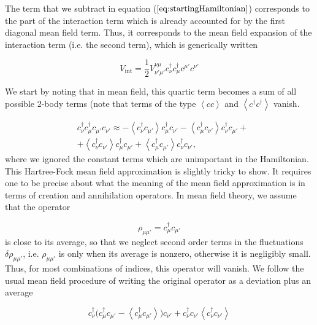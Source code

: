 \documentclass[10pt, twocolumn, twoside]{article}
\begin{document}
The term that we subtract in equation ($\ref{eq:startingHamiltonian}$) corresponds to the part of the interaction term which is already accounted for by the first diagonal mean field term. Thus, it corresponds to the mean field expansion of the interaction term (i.e. the second term), which is generically written

\begin{equation}
V_{\text{int}} = \frac{1}{2} V^{\nu\mu}_{\nu'\mu'} c_\nu^\dagger c_\mu^\dagger c^{\mu'} c^{\nu'}
\end{equation}

We start by noting that in mean field, this quartic term becomes a sum of all possible 2-body terms (note that terms of the type $\left\langle cc \right\rangle$ and $\left\langle c^\dagger c^\dagger \right\rangle$ vanish.

\begin{equation}\label{eq:c_mft}
\begin{split}
&c_\nu^\dagger c_\mu^\dagger c_{\mu'} c_{\nu'} \approx - \left\langle c_\nu^\dagger c_{\mu'} \right\rangle  c_{\mu}^\dagger c_{\nu'} - \left\langle c_{\mu}^\dagger c_{\nu'} \right\rangle c_{\nu}^\dagger c_{\mu'} + \\
&+ \left\langle c_{\nu}^\dagger c_{\nu'} \right\rangle  c_{\mu}^\dagger c_{\mu'} + \left\langle c_{\mu}^\dagger c_{\mu'} \right\rangle  c_{\nu}^\dagger c_{\nu'} ,
\end{split}
\end{equation}
where we ignored the constant terms which are unimportant in the Hamiltonian. This Hartree-Fock mean field approximation is slightly tricky to show. It requires one to be precise about what the meaning of the mean field approximation is in terms of creation and annihilation operators. In mean field theory, we assume that the operator

\begin{equation}
\rho_{\mu\mu'} = c_{\mu}^\dagger c_{\mu'}
\end{equation}
is close to its average, so that we neglect second order terms in the fluctuations $\delta \rho_{\mu\mu'}$, i.e. $\rho_{\mu\mu'}$ is  only when its average is nonzero, otherwise it is negligibly small. Thus, for most combinations of indices, this operator will vanish. We follow the usual mean field procedure of writing the original operator as a deviation plus an average

\begin{equation}\label{eq:hartree}
c_{\nu}^\dagger \bigg( c_\mu^\dagger c_{\mu'} - \left\langle c_\mu^\dagger c_{\mu'} \right\rangle \bigg) c_{\nu'} + c_{\nu}^\dagger c_{\nu'} \left\langle c_\nu^\dagger c_{\nu'} \right\rangle
\end{equation}
\end{document}
